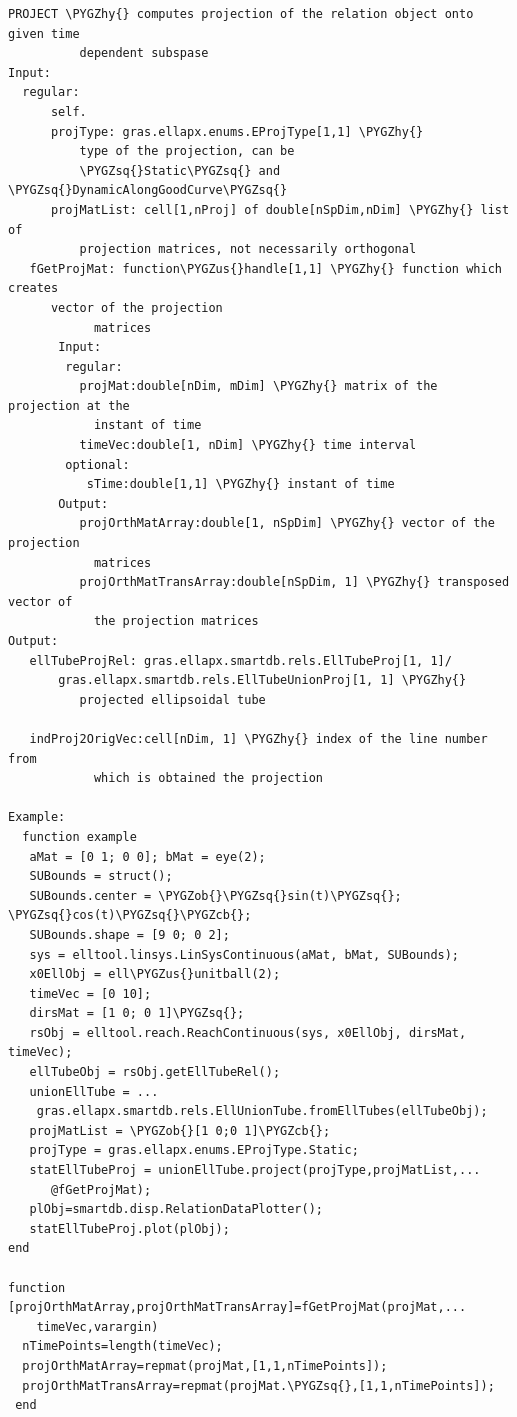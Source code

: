 \documentclass[letterpaper,10pt,english]{sphinxmanual}
\def\PYGZus{\char`\_}
\def\PYGZob{\char`\{}
\def\PYGZcb{\char`\}}
\def\PYGZhy{\char`\-}
\def\PYGZsq{\char`\'}
\begin{document}
\begin{Verbatim}[commandchars=\\\{\}]
PROJECT \PYGZhy{} computes projection of the relation object onto given time
          dependent subspase
Input:
  regular:
      self.
      projType: gras.ellapx.enums.EProjType[1,1] \PYGZhy{}
          type of the projection, can be
          \PYGZsq{}Static\PYGZsq{} and \PYGZsq{}DynamicAlongGoodCurve\PYGZsq{}
      projMatList: cell[1,nProj] of double[nSpDim,nDim] \PYGZhy{} list of
          projection matrices, not necessarily orthogonal
   fGetProjMat: function\PYGZus{}handle[1,1] \PYGZhy{} function which creates
      vector of the projection
            matrices
       Input:
        regular:
          projMat:double[nDim, mDim] \PYGZhy{} matrix of the projection at the
            instant of time
          timeVec:double[1, nDim] \PYGZhy{} time interval
        optional:
           sTime:double[1,1] \PYGZhy{} instant of time
       Output:
          projOrthMatArray:double[1, nSpDim] \PYGZhy{} vector of the projection
            matrices
          projOrthMatTransArray:double[nSpDim, 1] \PYGZhy{} transposed vector of
            the projection matrices
Output:
   ellTubeProjRel: gras.ellapx.smartdb.rels.EllTubeProj[1, 1]/
       gras.ellapx.smartdb.rels.EllTubeUnionProj[1, 1] \PYGZhy{}
          projected ellipsoidal tube

   indProj2OrigVec:cell[nDim, 1] \PYGZhy{} index of the line number from
            which is obtained the projection

Example:
  function example
   aMat = [0 1; 0 0]; bMat = eye(2);
   SUBounds = struct();
   SUBounds.center = \PYGZob{}\PYGZsq{}sin(t)\PYGZsq{}; \PYGZsq{}cos(t)\PYGZsq{}\PYGZcb{};
   SUBounds.shape = [9 0; 0 2];
   sys = elltool.linsys.LinSysContinuous(aMat, bMat, SUBounds);
   x0EllObj = ell\PYGZus{}unitball(2);
   timeVec = [0 10];
   dirsMat = [1 0; 0 1]\PYGZsq{};
   rsObj = elltool.reach.ReachContinuous(sys, x0EllObj, dirsMat, timeVec);
   ellTubeObj = rsObj.getEllTubeRel();
   unionEllTube = ...
    gras.ellapx.smartdb.rels.EllUnionTube.fromEllTubes(ellTubeObj);
   projMatList = \PYGZob{}[1 0;0 1]\PYGZcb{};
   projType = gras.ellapx.enums.EProjType.Static;
   statEllTubeProj = unionEllTube.project(projType,projMatList,...
      @fGetProjMat);
   plObj=smartdb.disp.RelationDataPlotter();
   statEllTubeProj.plot(plObj);
end

function [projOrthMatArray,projOrthMatTransArray]=fGetProjMat(projMat,...
    timeVec,varargin)
  nTimePoints=length(timeVec);
  projOrthMatArray=repmat(projMat,[1,1,nTimePoints]);
  projOrthMatTransArray=repmat(projMat.\PYGZsq{},[1,1,nTimePoints]);
 end
\end{Verbatim}
\end{document}
